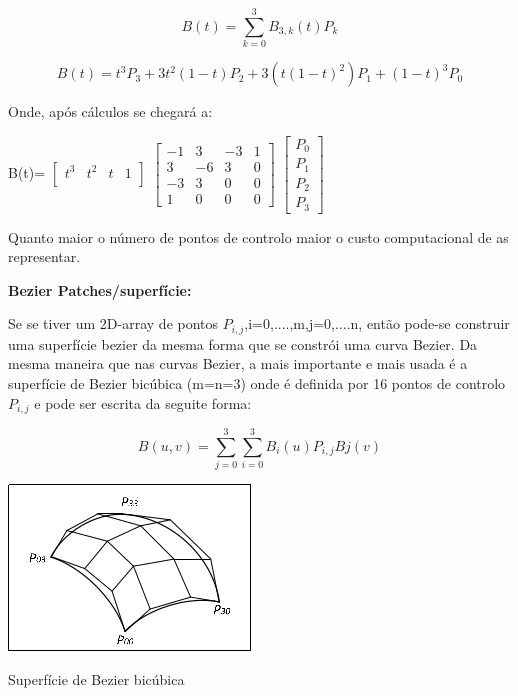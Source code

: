\begin{equation}
B(t)=\sum_{k=0}^{3}B_{3,k}(t)P_{k}
\end{equation}

\begin{equation}
B(t)=t^{3}P_{3}+3t^{2}(1-t)P_{2}+3(t(1-t)^{2})P_{1}+(1-t)^{3}P_{0}
\end{equation}

Onde, após cálculos se chegará a:

B(t)=  $\begin{bmatrix}
       t^{3} & t^{2} & t & 1          \\[0.3em]
		\end{bmatrix}$
		$\begin{bmatrix}
		       -1 & 3 & -3  & 1           \\[0.3em]
		        3 & -6 &  3 & 0   \\[0.3em]
		       -3 & 3 & 0 & 0 \\[0.3em]
		       1 & 0 & 0 & 0
		     \end{bmatrix}$
		$\begin{bmatrix}
		       P_{0}           \\[0.3em]
		       P_{1}   \\[0.3em]
		       P_{2} \\[0.3em]
		       P_{3}
		     \end{bmatrix}$


Quanto maior o número de pontos de controlo maior o custo computacional de as representar.

{\huge \textbf{Bezier Patches/superfície:}}

Se se tiver um 2D-array de pontos $P_{i,j}$,i=0,....,m,j=0,....n, então pode-se construir uma superfície bezier da mesma forma que se constrói uma curva Bezier. Da mesma maneira que nas curvas Bezier, a mais importante e mais usada é a superfície de Bezier bicúbica (m=n=3) onde é definida por 16 pontos de controlo $P_{i,j}$ e pode ser escrita da seguite forma:

\begin{equation}
B(u,v)=\sum_{j=0}^{3}\sum_{i=0}^{3}B_{i}(u)P_{i,j}B{j}(v)
\end{equation}



\begin{center}
 	
 	\includegraphics[scale=1,keepaspectratio]{resources/beziersupf.png}
 	\captionsetup{type=figure, width=0.8\linewidth}
	\caption{Superfície de Bezier bicúbica}
\label{fig:ssec1:diagram:plane:to:sphere} 
\end{center}

